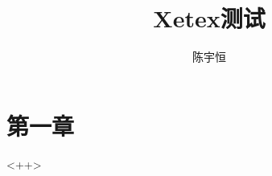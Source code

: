 \documentclass[a4paper]{article}
\begin{document}
\title{Xetex测试}
\author{陈宇恒}
\maketitle

\section{第一章}
<++>
\end{document}
